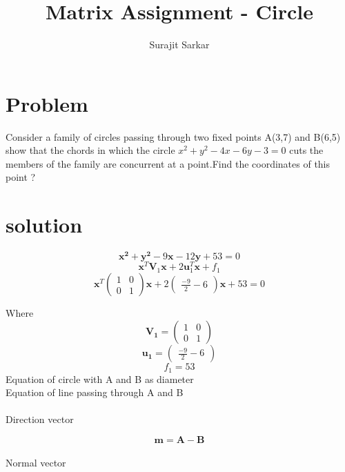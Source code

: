 \documentclass[journal,12pt,twocolumn]{IEEEtran}
\title{\mytitle}
\title
{
Matrix Assignment - Circle
}
\author{Surajit Sarkar}
\newcommand{\myvec}[1]{\ensuremath{\begin{pmatrix}#1\end{pmatrix}}}
\let\vec\mathbf
\begin{document}
\maketitle
\tableofcontents
\bigskip


\section{\textbf{Problem}}
Consider a family of circles passing through two fixed points A(3,7) and B(6,5) show that the chords in which the circle $x^2+y^2-4x-6y-3=0$ cuts the members of the family are concurrent at a point.Find the coordinates of this point ?
\section{\textbf{solution}}


\begin{equation}
    \vec{x^2+y^2}-9{\vec x}-12{\vec y}+53=0
\end{equation}
\begin{equation}
    {\vec{{x}}^T{\vec V}_1{\vec x}+2{\vec u}_1^T{\vec x}}+f_1
\end{equation}
\begin{equation}
    \vec{x}^T{\myvec{1&0\\0&1}}{\vec {x}+2 {\myvec{{\frac{-9}{2}}-6} {\vec {x }}}}+ 53=0
\end{equation}

Where
\begin{equation}
    \vec{V_1}={\myvec{1&0\\0&1} }
\end{equation}
\begin{equation}
    \vec{u_1}={\myvec{{\frac{-9}{2}}-6}}
\end{equation}
\begin{equation}
    f_1=53
\end{equation}
Equation of circle with A and B as diameter\\
Equation of line passing through A and B
\\ 
\\Direction vector  
  
\begin{equation}
    \vec{m= A-B}
\end{equation}
\\Normal vector
\end{document}
